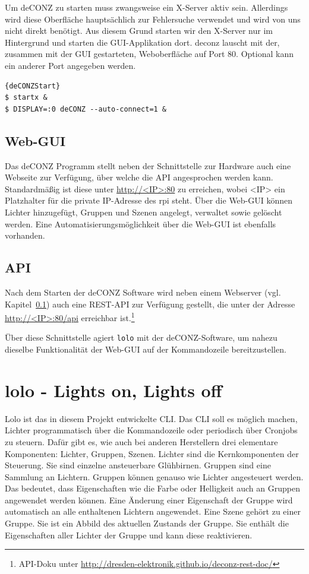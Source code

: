 \documentclass[a4paper,12pt]{article}
\begin{document}
Um deCONZ zu starten muss zwangsweise ein X-Server aktiv sein. Allerdings wird diese
Oberfläche hauptsächlich zur Fehlersuche verwendet und wird von uns nicht direkt benötigt.
Aus diesem Grund starten wir den X-Server nur im Hintergrund und starten die GUI-Applikation
dort.
\acrshort{deconz} lauscht mit der, zusammen mit der GUI gestarteten, Weboberfläche auf Port 80.
Optional kann ein anderer Port
angegeben werden.

\begin{lstlisting}[caption=deCONZ starten]{deCONZStart}
$ startx &
$ DISPLAY=:0 deCONZ --auto-connect=1 &
\end{lstlisting}

\subsection{Web-GUI}
\label{ss:webgui}

Das deCONZ Programm stellt neben der Schnittstelle zur Hardware auch eine Webseite zur
Verfügung, über welche die API angesprochen werden kann.
Standardmäßig ist diese unter \url{http://<IP>:80} zu erreichen, wobei <IP> ein
Platzhalter für die private IP-Adresse des \gls{rpi} steht. Über die Web-GUI können Lichter
hinzugefügt, Gruppen und Szenen angelegt, verwaltet sowie gelöscht werden. Eine
Automatisierungsmöglichkeit über die Web-GUI ist ebenfalls vorhanden.

\subsection{API}

Nach dem Starten der deCONZ Software wird neben einem Webserver (vgl. 
Kapitel~\ref{ss:webgui}) auch eine REST-API zur Verfügung gestellt, die unter
der Adresse \url{http://<IP>:80/api} erreichbar ist.\footnote{API-Doku unter \url{http://dresden-elektronik.github.io/deconz-rest-doc/}}

Über diese Schnittstelle agiert \texttt{lolo} mit der deCONZ-Software, um nahezu
dieselbe Funktionalität der Web-GUI auf der Kommandozeile bereitzustellen.

\newpage

\section{lolo - Lights on, Lights off}
\label{lolo}

Lolo ist das in diesem Projekt entwickelte CLI. Das CLI soll es möglich machen, Lichter programmatisch über die Kommandozeile oder periodisch über Cronjobs zu steuern. Dafür gibt es, wie auch bei anderen Herstellern drei elementare Komponenten: Lichter, Gruppen, Szenen. Lichter sind die Kernkomponenten der Steuerung. Sie sind einzelne ansteuerbare Glühbirnen. Gruppen sind eine Sammlung an Lichtern. Gruppen können genauso wie Lichter angesteuert werden. Das bedeutet, dass Eigenschaften wie die Farbe oder Helligkeit auch an Gruppen angewendet werden können. Eine Änderung einer Eigenschaft der Gruppe wird automatisch an alle enthaltenen Lichtern angewendet. Eine Szene gehört zu einer Gruppe. Sie ist ein Abbild des aktuellen Zustands der Gruppe. Sie enthält die Eigenschaften aller Lichter der Gruppe und kann diese reaktivieren.
\end{document}
